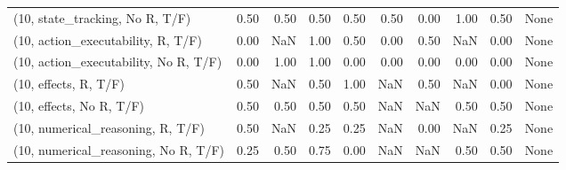 \begin{table*}[h!]
\begin{adjustbox}{width=2\columnwidth,center}
\begin{tabular}{lrrr|rrr|rrr}
(10, state\_tracking, No R, T/F)       &                      0.50 &                  0.50 &                      0.50 &                          0.50 &                      0.50 &                          0.00 &                                   1.00 &                               0.50 &                                  None \\
(10, action\_executability, R, T/F)    &                      0.00 &                   NaN &                      1.00 &                          0.50 &                      0.00 &                          0.50 &                                    NaN &                               0.00 &                                  None \\
(10, action\_executability, No R, T/F) &                      0.00 &                  1.00 &                      1.00 &                          0.00 &                      0.00 &                          0.00 &                                   0.00 &                               0.00 &                                  None \\
(10, effects, R, T/F)                 &                      0.50 &                   NaN &                      0.50 &                          1.00 &                       NaN &                          0.50 &                                    NaN &                               0.00 &                                  None \\
(10, effects, No R, T/F)              &                      0.50 &                  0.50 &                      0.50 &                          0.50 &                       NaN &                           NaN &                                   0.50 &                               0.50 &                                  None \\
(10, numerical\_reasoning, R, T/F)     &                      0.50 &                   NaN &                      0.25 &                          0.25 &                       NaN &                          0.00 &                                    NaN &                               0.25 &                                  None \\
(10, numerical\_reasoning, No R, T/F)  &                      0.25 &                  0.50 &                      0.75 &                          0.00 &                       NaN &                           NaN &                                   0.50 &                               0.50 &                                  None \\

\end{tabular}
\end{adjustbox}
\end{table*}

